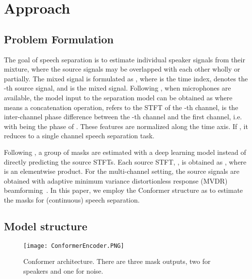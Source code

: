 \documentclass{article}
\begin{document}
	
	


	


	




	
	
	


	\section{Approach}
	\subsection{Problem Formulation}
	The goal of speech separation is to  estimate individual speaker signals from their mixture, where the source  signals may be overlapped with each other wholly or partially. The mixed signal is formulated as 
, 
	where  is the time index,  denotes the -th source signal, and  is the mixed signal. 
Following \cite{yoshioka2018multi}, 
	when  microphones are available, the model input to the separation model can be obtained as 
	 where  means a concatenation operation,  refers to the STFT of the -th channel,  is the inter-channel phase difference between the -th channel and the first channel, i.e.  with  being the phase of . 
	These features are normalized along the time axis. If , it reduces to a single channel speech separation task. 
	
	
	
	Following \cite{wang2014training, erdogan2017deep}, a group of masks  are estimated with a deep learning model  instead of  directly predicting the source STFTs. 
Each source STFT, , is obtained as , where  is an elementwise product. 
	For the multi-channel setting, 
	the source signals are obtained with adaptive minimum variance distortionless response (MVDR) beamforming~\cite{6516079}. 
	In this paper, we employ the Conformer  structure \cite{gulati2020conformer} as  to estimate the masks for (continuous) speech separation. 
	
	\subsection{Model structure}
	
	\begin{figure}[t]		
		\begin{center}
			\texttt{[image: ConformerEncoder.PNG]}
		\end{center}
		
		\caption{Conformer architecture. There are three mask outputs, two for speakers and one for noise.}\label{fig:conformer} 
		\vspace{-4.5mm}
		
	\end{figure} 
	
\end{document}
